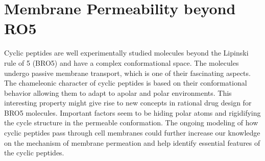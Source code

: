 \section{Membrane Permeability beyond RO5}
Cyclic peptides are well experimentally studied molecules beyond the Lipinski rule of 5 (BRO5) and have a complex conformational space. The molecules undergo passive membrane transport, which is one of their fascinating aspects.\cite{Rezai2006, Rezai2006A, Matsson2017,Whitty2016} 
The chameleonic character of cyclic peptides is based on their conformational behavior allowing them to adapt to apolar and polar environments.\cite{Witek2016, Witek2017, Witek2019, Wang2021} This interesting property might give rise to new concepts in rational drug design for BRO5 molecules.
Important factors seem to be hiding polar atoms and rigidifying the cycle structure in the permeable conformation.\cite{Witek2019, Wang2021} 
The ongoing modeling of how cyclic peptides pass through cell membranes could further increase our knowledge on the mechanism of membrane permeation and help identify essential features of the cyclic peptides.



